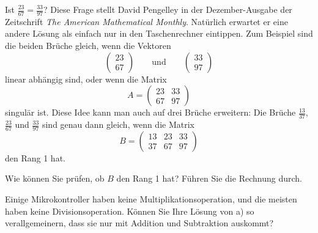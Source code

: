 Ist $\frac{23}{67}=\frac{33}{97}$? Diese Frage stellt David Pengelley
in der Dezember-Ausgabe der Zeitschrift {\it The American Mathematical
Monthly}. Natürlich erwartet er eine andere Lösung als einfach nur
in den Taschenrechner eintippen. Zum Beispiel sind die beiden Brüche
gleich, wenn die Vektoren
\[
\begin{pmatrix}
23\\67
\end{pmatrix}
\qquad\text{und}\qquad
\begin{pmatrix}
33\\97
\end{pmatrix}
\]
linear abhängig sind, oder wenn die Matrix
\[
A=
\begin{pmatrix}
23&33\\
67&97
\end{pmatrix}
\]
singulär ist. Diese Idee kann man auch auf drei Brüche erweitern: Die
Brüche $\frac{13}{37}$, $\frac{23}{67}$ und $\frac{33}{97}$ sind genau
dann gleich, wenn die Matrix
\[
B=\begin{pmatrix}
13&23&33\\
37&67&97
\end{pmatrix}
\]
den Rang 1 hat.

\begin{teilaufgaben}
\item Wie können Sie prüfen, ob $B$ den Rang 1 hat? Führen Sie die
Rechnung durch.
\item Einige Mikrokontroller haben keine Multiplikationsoperation, und
die meisten haben keine Divisionsoperation.
Können Sie Ihre Lösung von a) so verallgemeinern, dass sie nur mit
Addition und Subtraktion auskommt?
\end{teilaufgaben}

